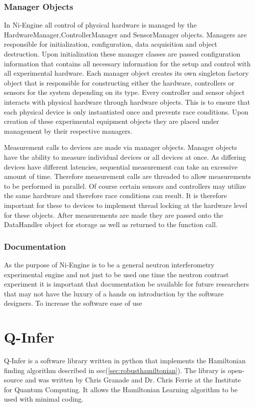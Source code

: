 \subsubsection{Manager Objects}
In Ni-Engine all control of physical hardware is managed by the HardwareManager,ControllerManager and SensorManager objects. Managers are responsible for initialization, configuration, data acquisition and object destruction. Upon initialization these manager classes are passed configuration information that contains all necessary information for the setup and control with all experimental hardware. Each manager object creates its own singleton factory object that is responsible for constructing either the hardware, controllers or sensors for the system depending on its type. Every controller and sensor object interacts with physical hardware through hardware objects. This is to ensure that each physical device is only instantiated once and prevents race conditions. Upon creation of these experimental equipment objects they are placed under management by their respective managers. 

Measurement calls to devices are made via manager objects. Manager objects have the ability to measure individual devices or all devices at once. As differing devices have different latencies, sequential measurement can take an excessive amount of time. Therefore measurement calls are threaded to allow measurements to be performed in parallel. Of course certain sensors and controllers may utilize the same hardware and therefore race conditions can result. It is therefore important for these to devices to implement thread locking at the hardware level for these objects. After measurements are made they are passed onto the DataHandler object for storage as well as returned to the function call. 
\subsubsection{Documentation}
As the purpose of Ni-Engine is to be a general neutron interferometry experimental engine and not just to be used one time the neutron contrast experiment it is important that documentation be available for future researchers that may not have the luxury of a hands on introduction by the software designers. To increase the software ease of use

\section{Q-Infer}
Q-Infer is a software library written in python that implements the Hamiltonian finding algorithm described in sec(\ref{sec:robusthamiltonian}).\cite{qinfer} The library is open-source and was written by Chris Granade and Dr. Chris Ferrie at the Institute for Quantum Computing. It allows the Hamiltonian Learning algorithm to be used with minimal coding.
